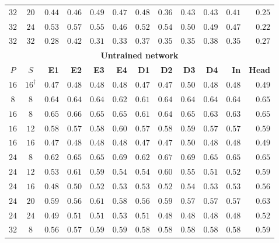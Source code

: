 \begin{table}[!tbp]
\begin{tabular}{@{}ccrrrrrrrrrr@{}}
        $32$ & $20$ & $0.44$ & $0.46$ & $0.49$ & $0.47$ & $0.48$ & $0.36$ & $0.43$ & $0.43$ & $0.41$ & $0.25$ \\
        $32$ & $24$ & $0.53$ & $0.57$ & $0.55$ & $0.46$ & $0.52$ & $0.54$ & $0.50$ & $0.49$ & $0.47$ & $0.22$ \\
        $32$ & $32$ & $0.28$ & $0.42$ & $0.31$ & $0.33$ & $0.37$ & $0.35$ & $0.35$ & $0.38$ & $0.35$ & $0.27$ \\
        \midrule
        \multicolumn{12}{c}{\textbf{Untrained network}} \\
        \midrule
        \textbf{$P$} & \textbf{$S$} & \textbf{E1} & \textbf{E2} & \textbf{E3} & \textbf{E4} & \textbf{D1} & \textbf{D2} & \textbf{D3} & \textbf{D4} & \textbf{In} & \textbf{Head} \\
        \midrule
        $16$ & $16^{\dagger}$ & $0.47$ & $0.48$ & $0.48$ & $0.48$ & $0.47$ & $0.47$ & $0.50$ & $0.48$ & $0.48$ & $0.49$ \\
        \midrule
        \addlinespace[2pt]
        $8$ & $8$ & $0.64$ & $0.64$ & $0.64$ & $0.62$ & $0.61$ & $0.64$ & $0.64$ & $0.64$ & $0.64$ & $0.65$ \\
        \addlinespace[2pt]
        $16$ & $8$ & $0.65$ & $0.66$ & $0.65$ & $0.65$ & $0.61$ & $0.64$ & $0.65$ & $0.63$ & $0.63$ & $0.65$ \\
        $16$ & $12$ & $0.58$ & $0.57$ & $0.58$ & $0.60$ & $0.57$ & $0.58$ & $0.59$ & $0.57$ & $0.57$ & $0.59$ \\
        $16$ & $16$ & $0.47$ & $0.48$ & $0.48$ & $0.48$ & $0.47$ & $0.47$ & $0.50$ & $0.48$ & $0.48$ & $0.49$ \\
        \addlinespace[2pt]
        $24$ & $8$ & $0.62$ & $0.65$ & $0.65$ & $0.69$ & $0.62$ & $0.67$ & $0.69$ & $0.65$ & $0.65$ & $0.65$ \\
        $24$ & $12$ & $0.53$ & $0.61$ & $0.59$ & $0.54$ & $0.54$ & $0.60$ & $0.55$ & $0.51$ & $0.52$ & $0.59$ \\
        $24$ & $16$ & $0.48$ & $0.50$ & $0.52$ & $0.53$ & $0.53$ & $0.52$ & $0.54$ & $0.53$ & $0.53$ & $0.56$ \\
        $24$ & $20$ & $0.59$ & $0.56$ & $0.61$ & $0.58$ & $0.56$ & $0.59$ & $0.57$ & $0.57$ & $0.57$ & $0.63$ \\
        $24$ & $24$ & $0.49$ & $0.51$ & $0.51$ & $0.53$ & $0.51$ & $0.48$ & $0.48$ & $0.48$ & $0.48$ & $0.52$ \\
        \addlinespace[2pt]
        $32$ & $8$ & $0.56$ & $0.57$ & $0.59$ & $0.59$ & $0.58$ & $0.58$ & $0.58$ & $0.58$ & $0.58$ & $0.59$ \\

\end{tabular}
\end{table}
